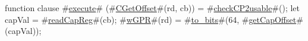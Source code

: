 function clause #\hyperref[zexecute]{execute}# (#\hyperref[zCGetOffset]{CGetOffset}#(rd, cb)) =
{
  #\hyperref[zcheckCP2usable]{checkCP2usable}#();
  let capVal = #\hyperref[zreadCapReg]{readCapReg}#(cb);
  #\hyperref[zwGPR]{wGPR}#(rd) = #\hyperref[ztozybits]{to\_bits}#(64, #\hyperref[zgetCapOffset]{getCapOffset}#(capVal));
}
